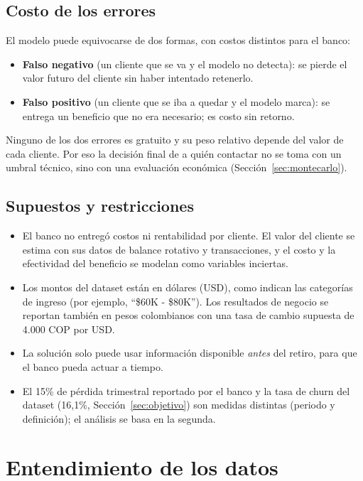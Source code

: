 \documentclass[11pt,a4paper]{article}
\begin{document}
\subsection{Costo de los errores}

El modelo puede equivocarse de dos formas, con costos distintos para el banco:
\begin{itemize}
  \item \textbf{Falso negativo} (un cliente que se va y el modelo no detecta): se pierde el valor futuro del cliente sin haber intentado retenerlo.
  \item \textbf{Falso positivo} (un cliente que se iba a quedar y el modelo marca): se entrega un beneficio que no era necesario; es costo sin retorno.
\end{itemize}
Ninguno de los dos errores es gratuito y su peso relativo depende del valor de cada cliente. Por eso la decisión final de a quién contactar no se toma con un umbral técnico, sino con una evaluación económica (Sección~\ref{sec:montecarlo}).

\subsection{Supuestos y restricciones}

\begin{itemize}
  \item El banco no entregó costos ni rentabilidad por cliente. El valor del cliente se estima con sus datos de balance rotativo y transacciones, y el costo y la efectividad del beneficio se modelan como variables inciertas.
  \item Los montos del dataset están en dólares (USD), como indican las categorías de ingreso (por ejemplo, ``\$60K - \$80K''). Los resultados de negocio se reportan también en pesos colombianos con una tasa de cambio supuesta de 4.000 COP por USD.
  \item La solución solo puede usar información disponible \emph{antes} del retiro, para que el banco pueda actuar a tiempo.
  \item El 15\% de pérdida trimestral reportado por el banco y la tasa de churn del dataset (16,1\%, Sección~\ref{sec:objetivo}) son medidas distintas (periodo y definición); el análisis se basa en la segunda.
\end{itemize}

\section{Entendimiento de los datos}
\label{sec:datos}
\end{document}
